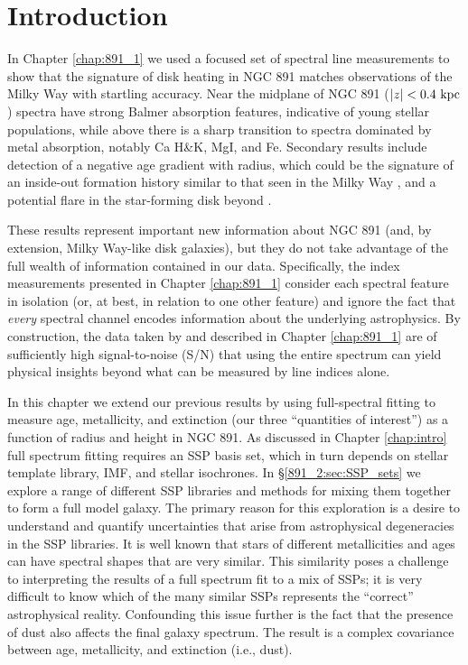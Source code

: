 \section{Introduction}

In Chapter \ref{chap:891_1} we used a focused set of spectral line
measurements to show that the signature of disk heating in NGC 891
matches observations of the Milky Way \citep[e.g.,][]{Bovy12,
  Hayden15} with startling accuracy. Near the midplane of NGC 891
($|z| < 0.4~\mathrm{kpc} $) spectra have strong Balmer absorption
features, indicative of young stellar populations, while above
 there is a sharp transition to spectra dominated by
metal absorption, notably Ca H\&K, MgI, and Fe. Secondary results
include detection of a negative age gradient with radius, which could
be the signature of an inside-out formation history similar to that
seen in the Milky Way \citep{Bovy12, Hayden15}, and a potential flare
in the star-forming disk beyond .

These results represent important new information about NGC 891 (and,
by extension, Milky Way-like disk galaxies), but they do not take
advantage of the full wealth of information contained in our
data. Specifically, the index measurements presented in Chapter
\ref{chap:891_1} consider each spectral feature in isolation (or, at
best, in relation to one other feature) and ignore the fact that
\emph{every} spectral channel encodes information about the underlying
astrophysics. By construction, the data taken by \GP and described in
Chapter \ref{chap:891_1} are of sufficiently high signal-to-noise
(S/N) that using the entire spectrum can yield physical insights
beyond what can be measured by line indices alone.

In this chapter we extend our previous results by using full-spectral
fitting to measure age, metallicity, and extinction (our three
``quantities of interest'') as a function of radius and height in NGC
891. As discussed in Chapter \ref{chap:intro} full spectrum fitting
requires an SSP basis set, which in turn depends on stellar template
library, IMF, and stellar isochrones. In \S\ref{891_2:sec:SSP_sets} we
explore a range of different SSP libraries and methods for mixing them
together to form a full model galaxy. The primary reason for this
exploration is a desire to understand and quantify uncertainties that
arise from astrophysical degeneracies in the SSP libraries. It is well
known \citep{Oconnel76,Aaronson78,Worthey94,dePaz02} that stars of
different metallicities and ages can have spectral shapes that are
very similar. This similarity poses a challenge to interpreting the
results of a full spectrum fit to a mix of SSPs; it is very difficult
to know which of the many similar SSPs represents the ``correct''
astrophysical reality. Confounding this issue further is the fact that
the presence of dust also affects the final galaxy spectrum. The
result is a complex covariance between age, metallicity, and
extinction (i.e., dust).

